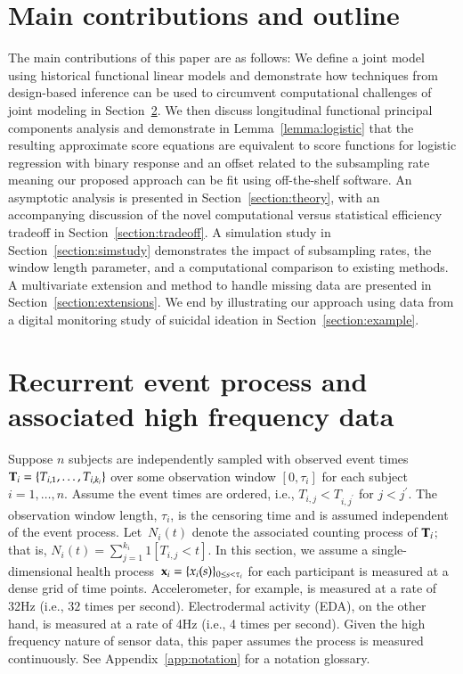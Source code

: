 \documentclass[12pt]{amsart}
\def\bfx{{\bf x}}
\def\bfT{{\bf T}}
\begin{document}
\section{Main contributions and outline}

The main contributions of this paper are as follows:
We define a joint model using historical functional linear models and demonstrate how techniques from design-based inference can be used to circumvent computational challenges of joint modeling in Section~\ref{section:modeloverview}. We then discuss longitudinal functional principal components analysis and demonstrate in Lemma~\ref{lemma:logistic} that the resulting approximate score equations are equivalent to score functions for logistic regression with binary response and an offset related to the subsampling rate meaning our proposed approach can be fit using off-the-shelf software.  An asymptotic analysis is presented in Section~\ref{section:theory}, with an accompanying discussion of the novel computational versus statistical efficiency tradeoff in Section~\ref{section:tradeoff}.   A simulation study in Section~\ref{section:simstudy} demonstrates the impact of subsampling rates, the window length parameter, and a computational comparison to existing methods.  A multivariate extension and method to handle missing data are presented in Section~\ref{section:extensions}.  We end by illustrating our approach using data from a digital monitoring study of suicidal ideation in Section~\ref{section:example}.


\section{Recurrent event process and associated high frequency data}
\label{section:modeloverview}

Suppose $n$ subjects are independently sampled with observed event times~$\bfT_{i} = \{ T_{i,1}, \ldots, T_{i,k_i}\}$ over some observation window $[0, \tau_i]$ for each subject $i = 1,\ldots, n$.  Assume the event times are ordered, i.e., $T_{i,j} < T_{i,j^\prime}$ for $j < j^\prime$. The observation window length, $\tau_i$, is the censoring time and is assumed independent of the event process. Let~$N_{i} (t)$ denote the associated counting process of $\bfT_{i}$; that is, $N_i (t) = \sum_{j=1}^{k_i} 1 [ T_{i,j} < t ]$. In this section, we assume a single-dimensional health process~$\bfx_i = \{ x_i (s) \}_{0 \le s < \tau_i}$ for each participant is measured at a dense grid of time points.  Accelerometer, for example, is measured at a rate of 32Hz (i.e., $32$ times per second). Electrodermal activity (EDA), on the other hand, is measured at a rate of 4Hz (i.e., 4 times per second).  Given the high frequency nature of sensor data, this paper assumes the process is measured continuously. See Appendix~\ref{app:notation} for a notation glossary.
\end{document}
